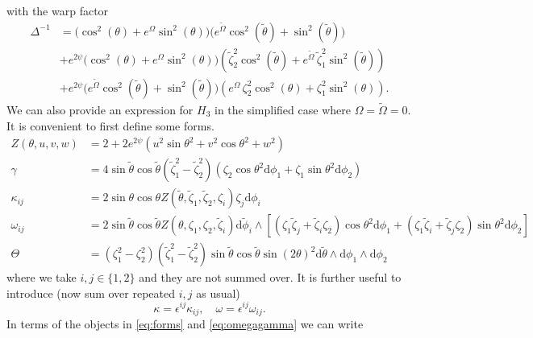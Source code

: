 \documentclass[a4paper, 11pt]{article}
\numberwithin{equation}{section}
\newcommand{\ts}[1]{\widetilde{#1}}
\newcommand{\+}{\oplus}
\renewcommand{\d}{\ensuremath{\mathrm{d}}\xspace}
\begin{document}
with the warp factor
\begin{equation}
	\begin{aligned}
	\Delta^{-1} &= \Big(\cos^{2}(\theta)+e^{\Omega}\sin^{2}(\theta)\Big)\Big(e^{\ts{\Omega}}\cos^{2}(\ts{\theta})+\sin^{2}(\ts{\theta})\Big)\\
	&+e^{2\psi}\Big(\cos^{2}(\theta)+e^{\Omega}\sin^{2}(\theta)\Big)\left(\ts{\zeta}_{2}^{2}\cos^{2}(\ts{\theta})+e^{\ts{\Omega}}\,\ts{\zeta}_{1}^{2}\sin^{2}(\ts{\theta})\right)\\
	&+e^{2\psi}\Big(e^{\ts{\Omega}}\cos^{2}(\ts{\theta})+\sin^{2}(\ts{\theta})\Big)\left(e^{\Omega}\,\zeta_{2}^{2}\cos^{2}(\theta)+\zeta_{1}^{2}\sin^{2}(\theta)\right).
	\end{aligned}
\end{equation}
We can also provide an expression for $H_3$ in the simplified case where $\Omega=\tilde\Omega=0$. It is convenient to first define some forms.
\begin{equation}\label{eq:forms}
	\begin{split}
		Z(\theta,u,v,w)&=2+2e^{2\psi}(u^2\sin \theta^2+v^2\cos \theta^2+w^2)\\
		\gamma&=4\sin\tilde\theta\cos\tilde \theta(\tilde{\zeta}_1^2-\tilde{\zeta}_2 ^2)\left(\zeta_2\cos \theta ^2\d \phi _1+\zeta _1\sin\theta ^2\d\phi _2\right)\\
		\kappa_{ij}&=2\sin \theta \cos \theta Z(\tilde \theta,\tilde{\zeta}_1,\tilde{\zeta}_2,\zeta_i)\zeta_j\d\phi_i\\
		\omega_{ij} &=2\sin\tilde\theta \cos\tilde\theta Z(\theta,\zeta_1,\zeta_2,\tilde\zeta _i)\d \tilde \phi _i\wedge \left [(\zeta _1\tilde \zeta _j + \tilde \zeta _i \zeta _2)\cos \theta ^2 \d \phi_1+ (\zeta _1\tilde \zeta _i + \tilde \zeta _j \zeta _2)\sin \theta ^2 \d \phi_2\right]\\
		\Theta&=(\zeta _1^2-\zeta_2 ^2)(\tilde{\zeta}_1 ^2-\tilde \zeta _2^2)\sin\tilde\theta \cos \tilde\theta \sin (2 \theta) ^2\d\tilde \theta\wedge\d \phi _1\wedge\d   \phi _2
	\end{split}
\end{equation}
where we take $i,j\in\{1,2\}$ and they are not summed over. It is further useful to introduce (now sum over repeated $i,j$ as usual)
\begin{equation}\label{eq:omegagamma}
	\kappa = \epsilon^{ij}\kappa_{ij},\quad \omega=\epsilon^{ij}\omega _{ij}.
\end{equation}
In terms of the objects in \eqref{eq:forms} and \eqref{eq:omegagamma} we can write 
\end{document}
